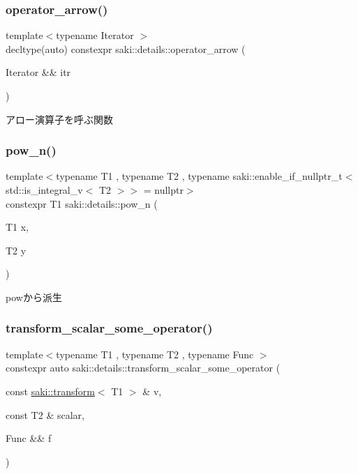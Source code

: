 \subsubsection{\texorpdfstring{operator\+\_\+arrow()}{operator\_arrow()}}
{\footnotesize\ttfamily template$<$typename Iterator $>$ \\
decltype(auto) constexpr saki\+::details\+::operator\+\_\+arrow (\begin{DoxyParamCaption}\item[{Iterator \&\&}]{itr }\end{DoxyParamCaption})}



アロー演算子を呼ぶ関数 

\mbox{\label{namespacesaki_1_1details_a30b4cd78c970618ee2886123c28e4041}} 
\subsubsection{\texorpdfstring{pow\+\_\+n()}{pow\_n()}}
{\footnotesize\ttfamily template$<$typename T1 , typename T2 , typename saki\+::enable\+\_\+if\+\_\+nullptr\+\_\+t$<$ std\+::is\+\_\+integral\+\_\+v$<$ T2 $>$$>$  = nullptr$>$ \\
constexpr T1 saki\+::details\+::pow\+\_\+n (\begin{DoxyParamCaption}\item[{T1}]{x,  }\item[{T2}]{y }\end{DoxyParamCaption})}



powから派生 

\mbox{\label{namespacesaki_1_1details_a28e351f8fafd551dda6ba3cb32e6d0af}} 
\subsubsection{\texorpdfstring{transform\+\_\+scalar\+\_\+some\+\_\+operator()}{transform\_scalar\_some\_operator()}}
{\footnotesize\ttfamily template$<$typename T1 , typename T2 , typename Func $>$ \\
constexpr auto saki\+::details\+::transform\+\_\+scalar\+\_\+some\+\_\+operator (\begin{DoxyParamCaption}\item[{const \mbox{\hyperlink{classsaki_1_1transform}{saki\+::transform}}$<$ T1 $>$ \&}]{v,  }\item[{const T2 \&}]{scalar,  }\item[{Func \&\&}]{f }\end{DoxyParamCaption})}



